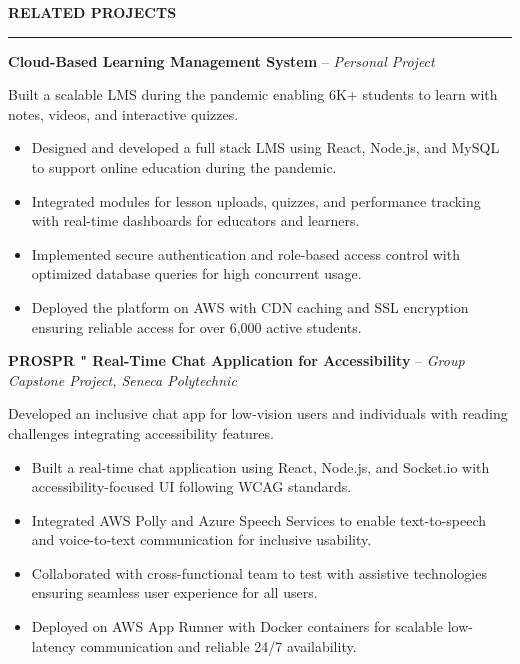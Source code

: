 \documentclass[10pt,letterpaper]{article}
\begin{document}
\vspace{6pt}

\textbf{RELATED PROJECTS}\\[-8pt]
\noindent\rule{\textwidth}{1pt}

\vspace{-2pt}

\textbf{Cloud-Based Learning Management System} -- \emph{Personal Project}

\vspace{-1pt}

Built a scalable LMS during the pandemic enabling 6K+ students to learn with notes, videos, and interactive quizzes.
\vspace{-1pt}
\begin{itemize}
\item Designed and developed a full stack LMS using React, Node.js, and MySQL to support online education during the pandemic.
\item Integrated modules for lesson uploads, quizzes, and performance tracking with real-time dashboards for educators and learners.
\item Implemented secure authentication and role-based access control with optimized database queries for high concurrent usage.
\item Deployed the platform on AWS with CDN caching and SSL encryption ensuring reliable access for over 6,000 active students.
\end{itemize}

\textbf{PROSPR " Real-Time Chat Application for Accessibility} -- \emph{Group Capstone Project, Seneca Polytechnic}

\vspace{-1pt}

Developed an inclusive chat app for low-vision users and individuals with reading challenges integrating accessibility features.
\vspace{-1pt}
\begin{itemize}
\item Built a real-time chat application using React, Node.js, and Socket.io with accessibility-focused UI following WCAG standards.
\item Integrated AWS Polly and Azure Speech Services to enable text-to-speech and voice-to-text communication for inclusive usability.
\item Collaborated with cross-functional team to test with assistive technologies ensuring seamless user experience for all users.
\item Deployed on AWS App Runner with Docker containers for scalable low-latency communication and reliable 24/7 availability.
\end{itemize}
\end{document}
